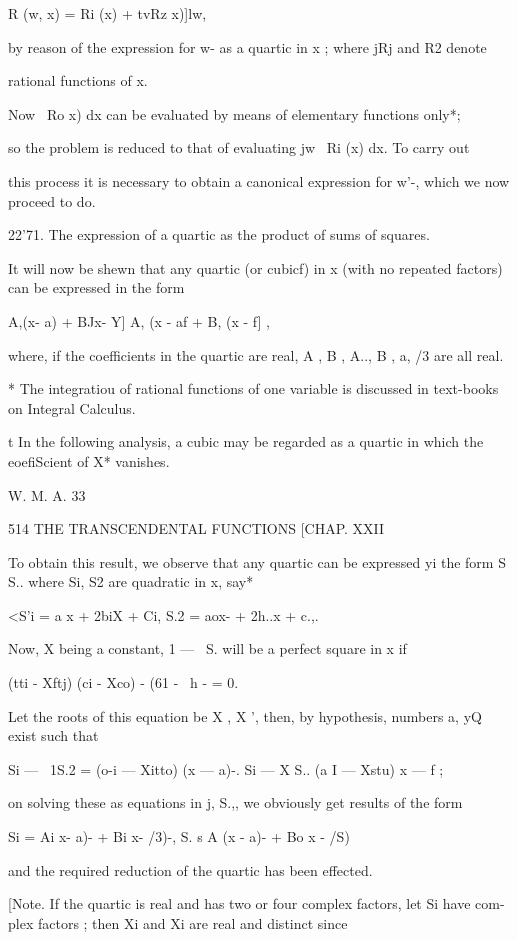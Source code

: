 R (w, x) = Ri (x) + tvRz x)]lw,

by reason of the expression for w- as a quartic in x ; where jRj and
R2 denote

rational functions of x.

Now \ Ro x) dx can be evaluated by means of elementary functions
only*;

so the problem is reduced to that of evaluating jw~ Ri (x) dx. To
carry out

this process it is necessary to obtain a canonical expression for w'-,
which we now proceed to do.

22'71. The expression of a quartic as the product of sums of squares.

It will now be shewn that any quartic (or cubicf) in x (with no
repeated factors) can be expressed in the form

 A,(x- a) + BJx- Y] A, (x - af + B, (x - f] ,

where, if the coefficients in the quartic are real, A , B , A.., B ,
a, /3 are all real.

* The integratiou of rational functions of one variable is discussed
in text-books on Integral Calculus.

t In the following analysis, a cubic may be regarded as a quartic in
which the eoefiScient of X* vanishes.

W. M. A. 33

514 THE TRANSCENDENTAL FUNCTIONS [CHAP. XXII

To obtain this result, we observe that any quartic can be expressed yi
the form S S.. where Si, S2 are quadratic in x, say*

<S'i = a x + 2biX + Ci, S.2 = aox- + 2h..x + c.,.

Now, X being a constant, 1 — \ S. will be a perfect square in x if

(tti - Xftj) (ci - Xco) - (61 - \ h - = 0.

Let the roots of this equation be X , X ', then, by hypothesis,
numbers a, yQ exist such that

Si — \ 1S.2 = (o-i — Xitto) (x — a)-. Si — X S.. (a I — Xstu) x — f ;

on solving these as equations in j, S.,, we obviously get results of
the form

Si = Ai x- a)- + Bi x- /3)-, S. s A (x - a)- + Bo x - /S)

and the required reduction of the quartic has been effected.

[Note. If the quartic is real and has two or four complex factors, let
Si have com- plex factors ; then Xi and Xi are real and distinct since


